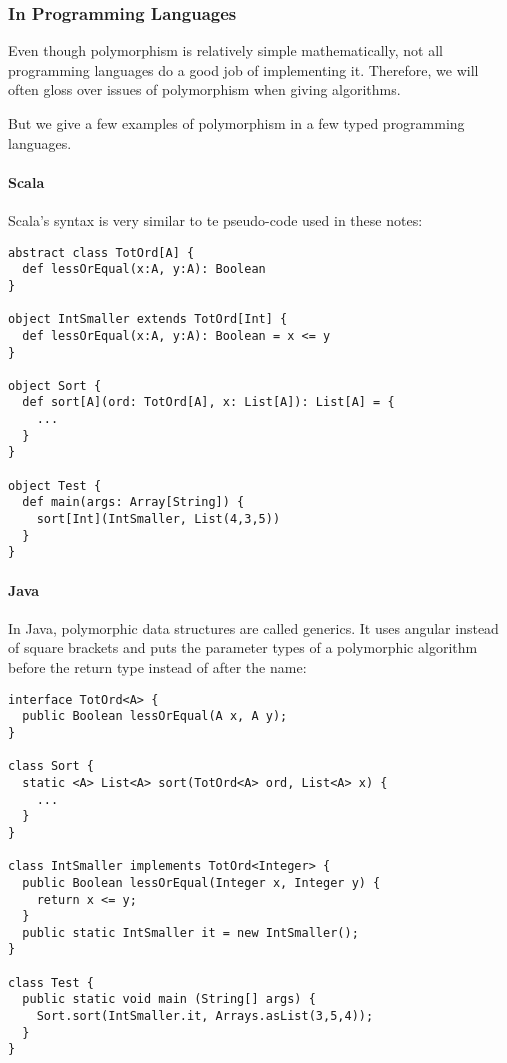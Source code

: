 \subsubsection{In Programming Languages}

Even though polymorphism is relatively simple mathematically, not all programming languages do a good job of implementing it.
Therefore, we will often gloss over issues of polymorphism when giving algorithms.

But we give a few examples of polymorphism in a few typed programming languages.

\paragraph{Scala}
Scala's syntax is very similar to te pseudo-code used in these notes:

\begin{lstlisting}
abstract class TotOrd[A] {
  def lessOrEqual(x:A, y:A): Boolean
}

object IntSmaller extends TotOrd[Int] {
  def lessOrEqual(x:A, y:A): Boolean = x <= y
}

object Sort {
  def sort[A](ord: TotOrd[A], x: List[A]): List[A] = {
    ...
  }
}

object Test {
  def main(args: Array[String]) {
    sort[Int](IntSmaller, List(4,3,5))
  }
}
\end{lstlisting}

\paragraph{Java}
In Java, polymorphic data structures are called generics.
It uses angular instead of square brackets and puts the parameter types of a polymorphic algorithm before the return type instead of after the name:

\begin{lstlisting}
interface TotOrd<A> {
  public Boolean lessOrEqual(A x, A y);
}

class Sort {
  static <A> List<A> sort(TotOrd<A> ord, List<A> x) {
    ...
  }
}

class IntSmaller implements TotOrd<Integer> {
  public Boolean lessOrEqual(Integer x, Integer y) {
    return x <= y;
  }
  public static IntSmaller it = new IntSmaller();
}

class Test {
  public static void main (String[] args) {
    Sort.sort(IntSmaller.it, Arrays.asList(3,5,4));
  }
}
\end{lstlisting}

